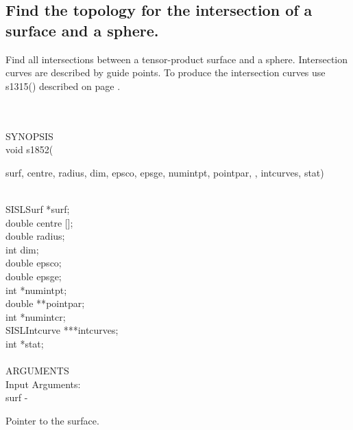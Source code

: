 \subsection{Find the topology for the intersection of a surface and a sphere.}
\begin{minipg1}
  Find all intersections between a tensor-product surface and a sphere.
  Intersection curves are described by guide points.
  To produce the intersection curves use s1315() described on page \pageref{s1315}.
\end{minipg1} \\ \\
SYNOPSIS\\
        \>void s1852(\begin{minipg3}
                {\fov surf}, {\fov centre}, {\fov radius}, {\fov dim}, {\fov epsco}, {\fov epsge}, {\fov numintpt},
                {\fov pointpar}, ,
                {\fov intcurves}, {\fov stat})
                \end{minipg3}\\[0.3ex]
                \>\>    SISLSurf        \>      *{\fov surf};\\
                \>\>    double  \>      {\fov centre} [];\\
                \>\>    double  \>      {\fov radius};\\
                \>\>    int     \>      {\fov dim};\\
                \>\>    double  \>      {\fov epsco};\\
                \>\>    double  \>      {\fov epsge};\\
                \>\>    int     \>      *{\fov numintpt};\\
                \>\>    double  \>      **{\fov pointpar};\\
                \>\>    int     \>      *{\fov numintcr};\\
                \>\>    SISLIntcurve\>  ***{\fov intcurves};\\
                \>\>    int     \>      *{\fov stat};\\
\\
ARGUMENTS\\
        \>Input Arguments:\\
        \>\>    {\fov surf}\> - \>              \begin{minipg2}
                                Pointer to the surface.
                                \end{minipg2}\\
